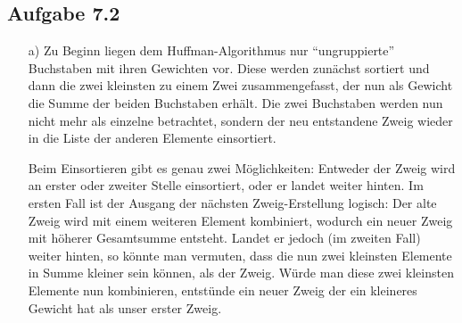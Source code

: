 \documentclass{article}
\begin{document}
    \subsection*{Aufgabe 7.2}
    \begin{enumerate}
        \item[a)]
        Zu Beginn liegen dem Huffman-Algorithmus nur "`ungruppierte"' Buchstaben mit ihren Gewichten vor. Diese werden zunächst sortiert und dann die zwei kleinsten zu einem Zwei zusammengefasst, der nun als Gewicht die Summe der beiden Buchstaben erhält. Die zwei Buchstaben werden nun nicht mehr als einzelne betrachtet, sondern der neu entstandene Zweig wieder in die Liste der anderen Elemente einsortiert. 
        
        Beim Einsortieren gibt es genau zwei Möglichkeiten: Entweder der Zweig wird an erster oder zweiter Stelle einsortiert, oder er landet weiter hinten. Im ersten Fall ist der Ausgang der nächsten Zweig-Erstellung logisch: Der alte Zweig wird mit einem weiteren Element kombiniert, wodurch ein neuer Zweig mit höherer Gesamtsumme entsteht. Landet er jedoch (im zweiten Fall) weiter hinten, so könnte man vermuten, dass die nun zwei kleinsten Elemente in Summe kleiner sein können, als der Zweig. Würde man diese zwei kleinsten Elemente nun kombinieren, entstünde ein neuer Zweig der ein kleineres Gewicht hat als unser erster Zweig. 


\end{enumerate}
\end{document}
